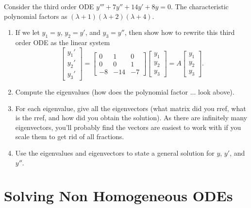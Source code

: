 \begin{problem}
 Consider the third order ODE $y'''+7y''+14y'+8y=0$.  The characteristic polynomial factors as $(\lambda+1)(\lambda+2)(\lambda+4)$.
\begin{enumerate}
 \item If we let $y_1=y$, $y_2=y'$, and $y_3=y''$, then show how to rewrite this third order ODE as the linear system
$$
\begin{bmatrix}
 y_1'\\y_2'\\y_3'
\end{bmatrix}
=\begin{bmatrix}
 0&1&0\\0&0&1\\-8&-14&-7
\end{bmatrix}
\begin{bmatrix}
 y_1\\y_2\\y_3
\end{bmatrix}
=A
\begin{bmatrix}
 y_1\\y_2\\y_3
\end{bmatrix}
.$$
\item Compute the eigenvalues (how does the polynomial factor ... look above). 
\item For each eigenvalue, give all the eigenvectors (what matrix did you rref, what is the rref, and how did you obtain the solution). As there are infinitely many eigenvectors, you'll probably find the vectors are easiest to work with if you scale them to get rid of all fractions. 
\item Use the eigenvalues and eigenvectors to state a general solution for $y$, $y'$, and $y''$.
\end{enumerate}

 
\end{problem}



\section{Solving Non Homogeneous ODEs}

